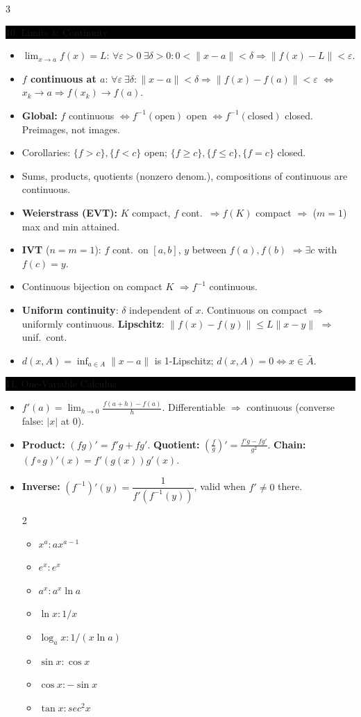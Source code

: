 \documentclass[8pt,letterpaper]{article}
\makeatletter
\newcommand{\sect}[1]{%
  \vspace{2.2pt}%
  \noindent\colorbox{black}{\parbox{\dimexpr\linewidth-2\fboxsep}{%
    \color{white}\bfseries\scshape\fontsize{6.4}{7.4}\selectfont
    \hyphenpenalty=10000\exhyphenpenalty=10000\raggedright #1}}%
  \vspace{1.4pt}\par\nopagebreak\@afterheading}
\newenvironment{tl}
  {\begin{itemize}[leftmargin=6pt,itemsep=0.3pt,topsep=1pt,parsep=0pt,
                   partopsep=0pt,label=\textcolor{gray}{\tiny$\bullet$}]}
  {\end{itemize}}
\newcommand{\nm}[1]{\lVert #1\rVert}
\makeatother
\begin{document}
\begin{multicols}{3}
\sect{10. Limits \& Continuity}
\begin{tl}
\item $\lim_{x\to a}f(x)=L$: $\forall\varepsilon>0\ \exists\delta>0: 0<\nm{x-a}<\delta\Rightarrow\nm{f(x)-L}<\varepsilon$.
\item \textbf{$f$ continuous at $a$}: $\forall\varepsilon\ \exists\delta:\nm{x-a}<\delta\Rightarrow\nm{f(x)-f(a)}<\varepsilon$ $\iff$ $x_k\to a\Rightarrow f(x_k)\to f(a)$.
\item \textbf{Global:} $f$ continuous $\iff f^{-1}(\text{open})$ open $\iff f^{-1}(\text{closed})$ closed. \colorbox{black!12}{Preimages, not images.}
\item Corollaries: $\{f>c\},\{f<c\}$ open; $\{f\ge c\},\{f\le c\},\{f=c\}$ closed.
\item Sums, products, quotients (nonzero denom.), compositions of continuous are continuous.
\item \textbf{Weierstrass (EVT):} $K$ compact, $f$ cont.\ $\Rightarrow f(K)$ compact $\Rightarrow$ ($m=1$) max and min attained.
\item \textbf{IVT} ($n=m=1$): $f$ cont.\ on $[a,b]$, $y$ between $f(a),f(b)$ $\Rightarrow\exists c$ with $f(c)=y$.
\item Continuous bijection on compact $K$ $\Rightarrow f^{-1}$ continuous.
\item \textbf{Uniform continuity}: $\delta$ independent of $x$. Continuous on compact $\Rightarrow$ uniformly continuous. \textbf{Lipschitz}: $\nm{f(x)-f(y)}\le L\nm{x-y}$ $\Rightarrow$ unif.\ cont.
\item $d(x,A)=\inf_{a\in A}\nm{x-a}$ is 1-Lipschitz; $d(x,A)=0\iff x\in\bar A$.
\end{tl}

\sect{11. One-Variable Calculus}
\begin{tl}
\item $f'(a)=\lim_{h\to0}\frac{f(a+h)-f(a)}{h}$. Differentiable $\Rightarrow$ continuous (converse false: $|x|$ at $0$).
\item \textbf{Product:} $(fg)'=f'g+fg'$. \textbf{Quotient:} $\left(\frac fg\right)'=\frac{f'g-fg'}{g^2}$. \textbf{Chain:} $(f\circ g)'(x)=f'(g(x))g'(x)$.
\item \textbf{Inverse:} $(f^{-1})'(y)=\dfrac{1}{f'(f^{-1}(y))}$, valid when $f'\ne0$ there.

{\setlength{\multicolsep}{0pt} %
\begin{multicols}{2}
\begin{itemize}
     \item $x^a: ax^{a-1}$
     \item $e^x: e^x$
     \item $a^x: a^x\ln a$
     \item $\ln x: 1/x$
     \item $\log_a x: 1/(x\ln a)$
     \item $\sin x: \cos x$
     \item $\cos x: -\sin x$
     \item $\tan x: sec^{2}x$ 
\end{itemize}
\end{multicols}}
    

\end{tl}
\end{multicols}
\end{document}
